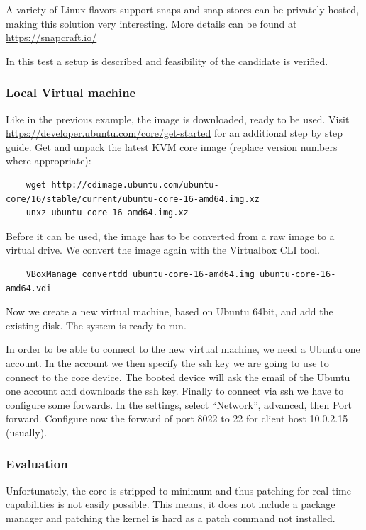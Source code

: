\documentclass[]{scrartcl}
\begin{document}
A variety of Linux flavors support snaps and snap stores can be privately hosted, making this solution very interesting. More details can be found at \url{https://snapcraft.io/}

In this test a setup is described and feasibility of the candidate is verified.

\subsubsection{Local Virtual machine}

Like in the previous example, the image is downloaded, ready to be used. Visit \url{https://developer.ubuntu.com/core/get-started} for an additional step by step guide.
Get and unpack the latest KVM core image (replace version numbers where appropriate):

\begin{verbatim}
	wget http://cdimage.ubuntu.com/ubuntu-core/16/stable/current/ubuntu-core-16-amd64.img.xz
	unxz ubuntu-core-16-amd64.img.xz
\end{verbatim}

Before it can be used, the image has to be converted from a raw image to a virtual drive. We convert the image again with the Virtualbox CLI tool.

\begin{verbatim}
	VBoxManage convertdd ubuntu-core-16-amd64.img ubuntu-core-16-amd64.vdi
\end{verbatim}

Now we create a new virtual machine, based on Ubuntu 64bit, and add the existing disk. The system is ready to run.

In order to be able to connect to the new virtual machine, we need a Ubuntu one account. In the account we then specify the ssh key we are going to use to connect to the core device. The booted device will ask the email of the Ubuntu one account and downloads the ssh key. Finally to connect via ssh we have to configure some forwards. In the settings, select ``Network'', advanced, then Port forward. Configure now the forward of port 8022 to 22 for client host 10.0.2.15 (usually).

\subsubsection{Evaluation}

Unfortunately, the core is stripped to minimum and thus patching for real-time capabilities is not easily possible. This means, it does not include a package manager and patching the kernel is hard as a patch command not installed.
\end{document}
